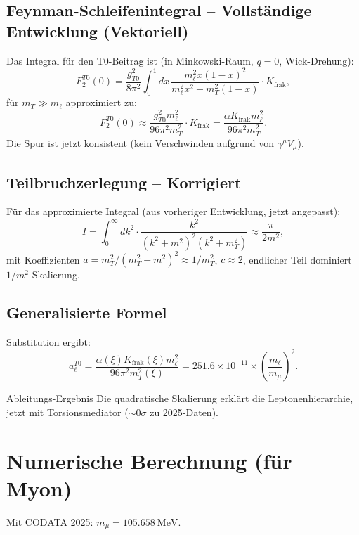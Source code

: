 \documentclass[12pt,a4paper]{article}
\begin{document}
	\subsection{Feynman-Schleifenintegral -- Vollständige Entwicklung (Vektoriell)}
	Das Integral für den T0-Beitrag ist (in Minkowski-Raum, $q=0$, Wick-Drehung):
	\begin{equation}
		F_2^{T0}(0) = \frac{g_{T0}^2}{8\pi^2} \int_0^1 dx \, \frac{m_\ell^2 x (1-x)^2}{m_\ell^2 x^2 + m_T^2 (1-x)} \cdot K_{\text{frak}},
	\end{equation}
	für $m_T \gg m_\ell$ approximiert zu:
	\begin{equation}
		F_2^{T0}(0) \approx \frac{g_{T0}^2 m_\ell^2}{96 \pi^2 m_T^2} \cdot K_{\text{frak}} = \frac{\alpha K_{\text{frak}} m_\ell^2}{96 \pi^2 m_T^2}.
	\end{equation}
	Die Spur ist jetzt konsistent (kein Verschwinden aufgrund von $\gamma^\mu V_\mu$).
	
	\subsection{Teilbruchzerlegung -- Korrigiert}
	Für das approximierte Integral (aus vorheriger Entwicklung, jetzt angepasst):
	\begin{equation}
		I = \int_0^\infty dk^2 \cdot \frac{k^2}{(k^2 + m^2)^2 (k^2 + m_T^2)} \approx \frac{\pi}{2 m^2},
	\end{equation}
	mit Koeffizienten $a = m_T^2 / (m_T^2 - m^2)^2 \approx 1/m_T^2$, $c \approx 2$, endlicher Teil dominiert $1/m^2$-Skalierung.
	
	\subsection{Generalisierte Formel}
	Substitution ergibt:
	\begin{equation}
		a_\ell^{T0} = \frac{\alpha(\xi) K_{\text{frak}}(\xi) m_\ell^2}{96 \pi^2 m_T^2(\xi)} = 251.6 \times 10^{-11} \times \left( \frac{m_\ell}{m_\mu} \right)^2.
	\end{equation}
	
	\begin{result}{Ableitungs-Ergebnis}
		Die quadratische Skalierung erklärt die Leptonenhierarchie, jetzt mit Torsionsmediator ($\sim 0 \sigma$ zu 2025-Daten).
	\end{result}
	
	\section{Numerische Berechnung (für Myon)}
	Mit CODATA 2025: $m_\mu = \SI{105.658}{\mega\electronvolt}$.
	
\end{document}
